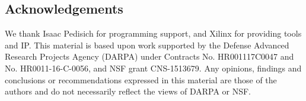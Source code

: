 \documentclass[sigconf]{acmart}
\begin{document}



\maketitle








\subsection*{Acknowledgements}
We thank Isaac Pedisich for programming support, and Xilinx for
providing tools and IP.
This material is based upon work supported by the Defense Advanced
Research Projects Agency (DARPA) under Contracts No. HR001117C0047
and No. HR0011-16-C-0056, and NSF grant CNS-1513679.
Any opinions, findings and conclusions or recommendations expressed in
this material are those of the authors and do not necessarily reflect
the views of DARPA or NSF.



\end{document}
